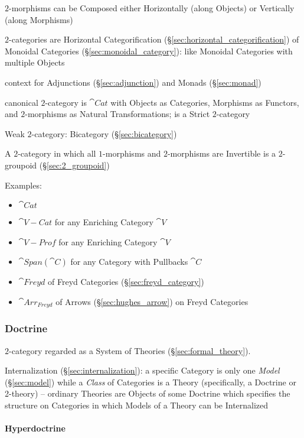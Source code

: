 $2$-morphisms can be Composed either Horizontally (along Objects) or
Vertically (along Morphisms)

$2$-categories are Horizontal Categorification
(\S\ref{sec:horizontal_categorification}) of Monoidal Categories
(\S\ref{sec:monoidal_category}): like Monoidal Categories with
multiple Objects

context for Adjunctions (\S\ref{sec:adjunction}) and Monads
(\S\ref{sec:monad})

canonical $2$-category is $\cat{Cat}$ with Objects as Categories,
Morphisms as Functors, and $2$-morphisms as Natural Transformations;
is a Strict $2$-category

Weak $2$-category: Bicategory (\S\ref{sec:bicategory})

A $2$-category in which all $1$-morphisms and $2$-morphisms are
Invertible is a $2$-groupoid (\S\ref{sec:2_groupoid})

Examples:
\begin{itemize}
\item $\cat{Cat}$
\item $\cat{V-Cat}$ for any Enriching Category $\cat{V}$
\item $\cat{V-Prof}$ for any Enriching Category $\cat{V}$
\item $\cat{Span}(\cat{C})$ for any Category with Pullbacks $\cat{C}$
\item $\cat{Freyd}$ of Freyd Categories (\S\ref{sec:freyd_category})
\item $\cat{Arr_{Freyd}}$ of Arrows (\S\ref{sec:hughes_arrow}) on
  Freyd Categories
\end{itemize}



\subsubsection{Doctrine}\label{sec:doctrine}

$2$-category regarded as a System of Theories
(\S\ref{sec:formal_theory}).

Internalization (\S\ref{sec:internalization}): a specific Category is
only one \emph{Model} (\S\ref{sec:model}) while a \emph{Class} of
Categories is a Theory (specifically, a Doctrine or 2-theory) --
ordinary Theories are Objects of some Doctrine which specifies the
structure on Categories in which Models of a Theory can be Internalized



\paragraph{Hyperdoctrine}\label{sec:hyperdoctrine}\hfill


